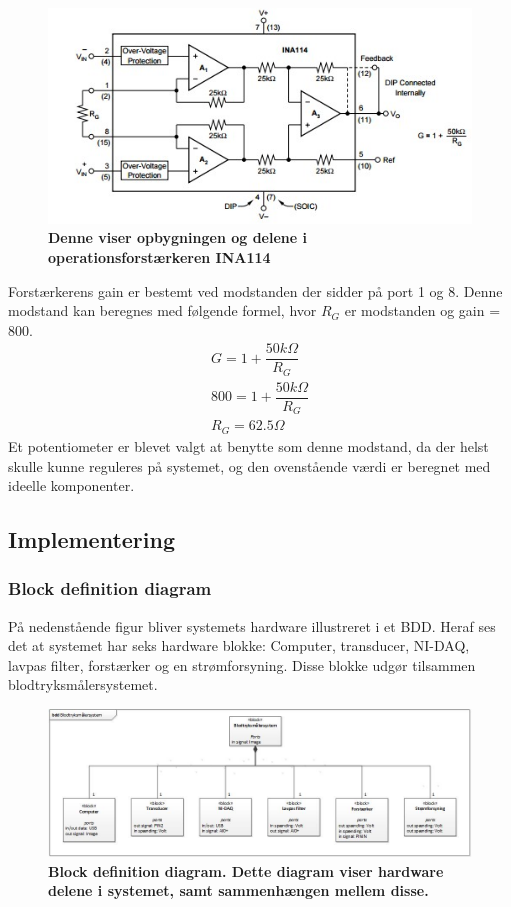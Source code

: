 \begin{figure}[H]
\includegraphics[width =1.0\textwidth , center]{billeder/forstarker}
\caption{\textbf{Denne viser opbygningen og delene i operationsforstærkeren INA114}}
\end{figure}
Forstærkerens gain er bestemt ved modstanden der sidder på port 1 og 8. Denne modstand kan beregnes med følgende formel, hvor $R_G$ er modstanden og gain = 800.
\begin{align}
G=1+\dfrac{50k\Omega}{R_G}\\
800 = 1+\dfrac{50k\Omega}{R_G}\\
R_G=62.5\Omega
\end{align}
Et potentiometer er blevet valgt at benytte som denne modstand, da der helst skulle kunne reguleres på systemet, og den ovenstående værdi er beregnet med ideelle komponenter.
\subsection{Implementering}
\subsubsection{Block definition diagram}
På nedenstående figur bliver systemets hardware illustreret i et BDD. Heraf ses det at systemet har seks hardware blokke: Computer, transducer, NI-DAQ, lavpas filter, forstærker og en strømforsyning. Disse blokke udgør tilsammen blodtryksmålersystemet.
\begin{figure}[H]
\includegraphics[width =1.0\textwidth , center]{billeder/BDD}
\caption{\textbf{Block definition diagram. Dette diagram viser hardware delene i systemet, samt sammenhængen mellem disse.}}
\end{figure}
